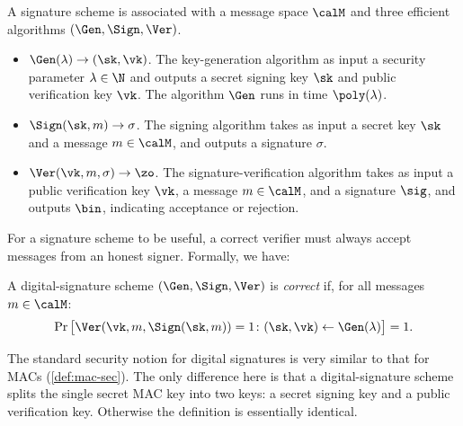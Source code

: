 \begin{definition}
	A signature scheme is associated with a message space $\calM$ and three efficient algorithms $(\Gen, \Sign, \Ver)$.

	\begin{itemize}
    \item $\Gen(\lambda) \to (\sk, \vk)$.
      The key-generation algorithm as input a security parameter $\lambda \in \N$ and outputs a secret signing key $\sk$ and public verification key $\vk$.
      The algorithm $\Gen$ runs in time $\poly(\lambda)$.
    \item $\Sign(\sk, m) \to \sigma$.
      The signing algorithm takes as input a secret key $\sk$ and a message $m \in \calM$, and outputs a signature $\sigma$.
    \item $\Ver(\vk, m, \sigma) \to \zo$.
      The signature-verification algorithm takes as input a public verification key $\vk$, a message $m \in \calM$, and a signature $\sig$, 
      and outputs $\bin$, indicating acceptance or rejection.
	\end{itemize}
	
\end{definition}

For a signature scheme to be useful, a correct verifier must always accept messages from an
honest signer. Formally, we have:

\begin{definition}
  A digital-signature scheme $(\Gen, \Sign, \Ver)$ is \emph{correct} if,
  for all messages $m \in \calM$:
  \[ \Pr\big[\Ver(\vk, m, \Sign(\sk, m)) = 1 \colon (\sk, \vk) \gets \Gen(\lambda) \big] = 1. \]
\end{definition}

The standard security notion for digital signatures is very similar
to that for MACs (\cref{def:mac-sec}).
The only difference here is that a digital-signature scheme splits the single
secret MAC key into two keys: a secret signing key and a public verification key.
Otherwise the definition is essentially identical.

